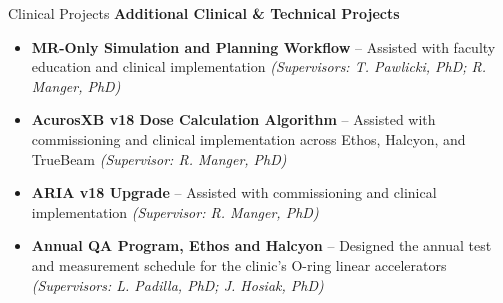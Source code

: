 \documentclass[
	11pt, %
]{resume} %
\begin{document}
\begin{rSection}{Clinical Projects}
	\textbf{Additional Clinical \& Technical Projects}
	\vspace{-.2cm}
	\begin{itemize}[label=$\cdot$]
		\itemsep-0.5em
		\item \textbf{MR-Only Simulation and Planning Workflow} -- Assisted with faculty education and clinical implementation \textit{(Supervisors: T. Pawlicki, PhD; R. Manger, PhD)}
		\item \textbf{AcurosXB v18 Dose Calculation Algorithm} -- Assisted with commissioning and clinical implementation across Ethos, Halcyon, and TrueBeam \textit{(Supervisor: R. Manger, PhD)}
		\item \textbf{ARIA v18 Upgrade} -- Assisted with commissioning and clinical implementation \textit{(Supervisor: R. Manger, PhD)}
		\item \textbf{Annual QA Program, Ethos and Halcyon} -- Designed the annual test and measurement schedule for the clinic's O-ring linear accelerators \textit{(Supervisors: L. Padilla, PhD; J. Hosiak, PhD)}
	\end{itemize}

\end{rSection}
\vspace{0.5cm}

\end{document}
